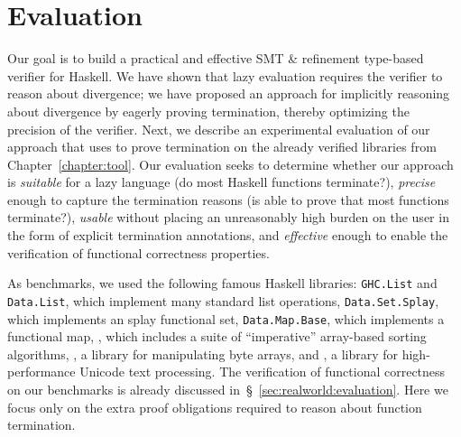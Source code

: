 \section{Evaluation}\label{sec:refinedhaskell:evaluation}

Our goal is to build a practical and effective 
SMT \& refinement type-based verifier for Haskell. 
%
We have shown that lazy evaluation requires the 
verifier to reason about divergence; we have proposed 
an approach for implicitly reasoning about divergence 
by eagerly proving termination, thereby optimizing 
the precision of the verifier.
%
Next, we describe an experimental evaluation of our 
approach that uses \toolname to prove termination 
on the already verified libraries from Chapter~\ref{chapter:tool}.
%
Our evaluation seeks to determine whether our approach is
%
\emph{suitable} for a lazy language (\ie do most Haskell functions terminate?),
\emph{precise}  enough to  capture the termination reasons (\ie is \toolname able to prove that most functions terminate?), 
\emph{usable}   without placing an unreasonably high burden on the user in the form of explicit termination annotations, and
\emph{effective}  enough to  enable the verification of functional correctness properties.
%


As benchmarks, we used the following famous Haskell libraries:
%
\texttt{GHC.List} and \texttt{Data.List}, which implement many standard
list operations,
\texttt{Data.Set.Splay}, which implements an splay functional set,
\texttt{Data.Map.Base}, which implements a functional 
map,
\libvectoralgos, 
which includes a suite of ``imperative'' %
array-based sorting algorithms,
\bytestring, a library for manipulating byte arrays, and
\libtext, a library for high-performance Unicode text processing. 
%
The verification of functional correctness on our benchmarks
is already discussed in~\S~\ref{sec:realworld:evaluation}. 
%
Here we focus only on the extra proof obligations 
required to reason about function termination. 

